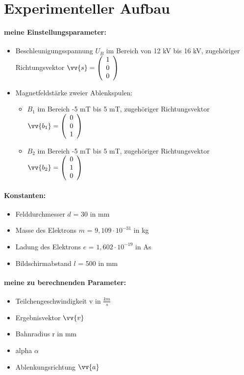 \section{Experimenteller Aufbau}

\paragraph{meine Einstellungsparameter:}

\begin{itemize}
    \item Beschleunigungsspannung $U_B$ im Bereich von 12 kV bis 16 kV, zugehöriger Richtungsvektor $\vv{s} = \vektor{1}{0}{0}$
    \item Magnetfeldstärke zweier Ablenkspulen:
    
    \begin{itemize}
        \item $B_1$ im Bereich -5 mT bis 5 mT, zugehöriger Richtungsvektor $\vv{b_1} = \vektor{0}{0}{1}$ %
        \item $B_2$ im Bereich -5 mT bis 5 mT, zugehöriger Richtungsvektor $\vv{b_2} = \vektor{0}{1}{0}$ %
    \end{itemize}

\end{itemize}

\paragraph{Konstanten:}

\begin{itemize}
    \item Felddurchmesser $d$ = 30 in mm
    \item Masse des Elektrons $m$ =  $9,109 \cdot 10^{-31}$ in kg
    \item Ladung des Elektrons $e$ = $1,602 \cdot 10^{-19}$ in As
    \item Bildschirmabstand $l$ = 500 in mm
\end{itemize}

\paragraph{meine zu berechnenden Parameter:}

\begin{itemize}
    \item Teilchengeschwindigkeit v in $\frac{km}{s}$
    \item Ergebnisvektor $\vv{v}$
    \item Bahnradius r in mm 
    \item alpha $\alpha$
    \item Ablenkungsrichtung $\vv{a}$
\end{itemize}


